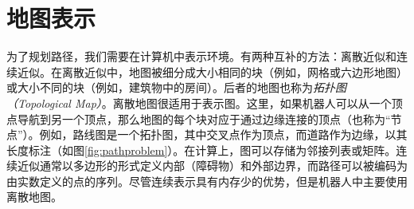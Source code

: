 \section{地图表示}
\label{sec:maps}


为了规划路径，我们需要在计算机中表示环境。有两种互补的方法：离散近似和连续近似。在离散近似中，地图被细分成大小相同的块（例如，网格或六边形地图）或大小不同的块（例如，建筑物中的房间）。后者的地图也称为\emph{拓扑图（Topological Map）}。离散地图很适用于表示图。这里，如果机器人可以从一个顶点导航到另一个顶点，那么地图的每个块对应于通过边缘连接的顶点（也称为“节点”）。例如，路线图是一个拓扑图，其中交叉点作为顶点，而道路作为边缘，以其长度标注（如图\ref{fig:pathproblem}）。在计算上，图可以存储为邻接列表或矩阵。连续近似通常以多边形的形式定义内部（障碍物）和外部边界，而路径可以被编码为由实数定义的点的序列。尽管连续表示具有内存少的优势，但是机器人中主要使用离散地图。


